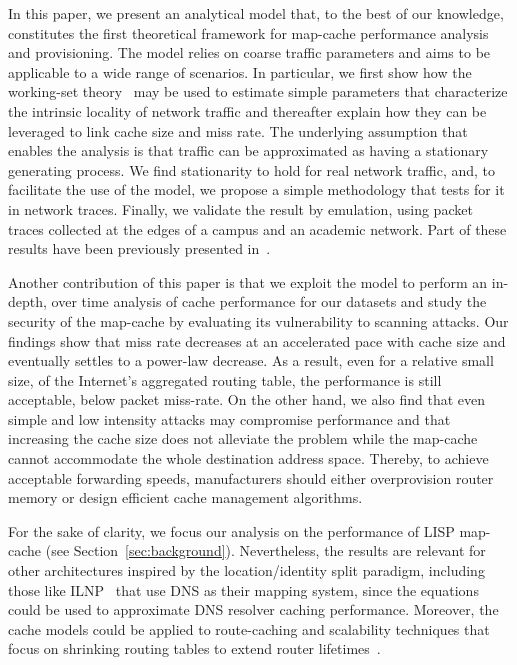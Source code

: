 In this paper, we present an analytical model that, to the best of our
knowledge, constitutes the first theoretical framework for map-cache
performance analysis and provisioning. The model relies on coarse traffic
parameters and aims to be applicable to a wide range of scenarios. In
particular, we first show how the working-set theory~\cite{denning:ws_model} may be
used to estimate simple parameters that characterize the intrinsic locality of network
traffic and thereafter explain how they can be leveraged to link cache size and miss rate. 
The underlying assumption that enables the analysis is that traffic can be
approximated as having a stationary generating process. We find
stationarity to hold for real network traffic, and, to facilitate the use of the model,
we propose a simple methodology that tests for it in network traces.
Finally, we validate the result by emulation, using packet traces collected at
the edges of a campus and an academic network. Part of these results have been
previously presented in~\cite{coras:lcache_n}.







Another contribution of this paper is that we exploit the model to 
perform an in-depth, over time analysis of cache performance for our datasets
and  study the security of the map-cache by evaluating its vulnerability
to scanning attacks. Our findings show that miss rate decreases at an
accelerated pace with cache size and eventually settles to a power-law
decrease. As a result, even for a relative small size,  of the
Internet's aggregated routing table, the performance is still acceptable,
below  packet miss-rate.
On the other hand, we also find that even simple and low
intensity attacks may compromise performance and that increasing
the cache size does not alleviate the problem while the map-cache cannot
accommodate the whole destination address space. Thereby, to achieve acceptable
forwarding speeds, manufacturers should either overprovision router memory or
design efficient cache management algorithms. 



For the sake of clarity, we focus our analysis on the performance of LISP
map-cache (see Section~\ref{sec:background}). Nevertheless, the results are
relevant for other architectures inspired by the location/identity split
paradigm, including those like ILNP~\cite{RFC6740} that use DNS as their
mapping system, since the equations could be used to approximate DNS resolver
caching performance. Moreover, the cache models could be applied to
route-caching and scalability techniques that focus on shrinking routing
tables to extend router lifetimes~\cite{ballani:viaggre}.

